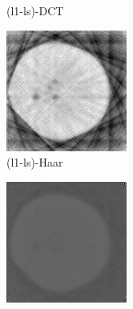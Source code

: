 \documentclass[journal]{IEEEtran}
\begin{document}
\begin{figure}[!h]
\begin{subfigure}[b]{0.24\linewidth}
        \caption{(l1-ls)-DCT}
     \end{subfigure}
    \begin{subfigure}[b]{0.24\linewidth}
        \includegraphics[width=\textwidth]{../images/potato/2D/cs_wavelet.png}
        \caption{(l1-ls)-Haar}
     \end{subfigure}
    \begin{subfigure}[b]{0.24\linewidth}
        \includegraphics[width=\textwidth]{../images/potato/2D/art.png}

\end{subfigure}
\end{figure}
\end{document}
